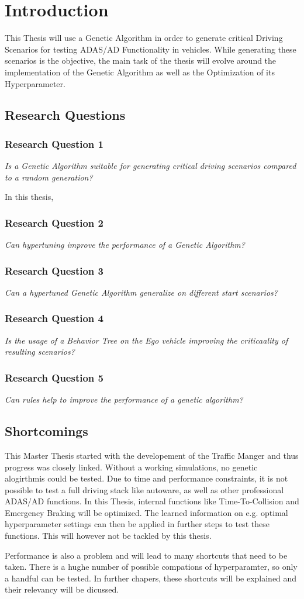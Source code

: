 \chapter{Introduction}
This Thesis will use a Genetic Algorithm in order to generate critical Driving Scenarios for testing ADAS/AD Functionality in vehicles.
While generating these scenarios is the objective, the main task of the thesis will evolve around the implementation of the Genetic Algorithm as well as the Optimization of its Hyperparameter.


\section{Research Questions}
\subsection{Research Question 1}
\textit{Is a Genetic Algorithm suitable for generating critical driving scenarios compared to a random generation?}

In this thesis, 

\subsection{Research Question 2}
\textit{Can hypertuning improve the performance of a Genetic Algorithm?}

\subsection{Research Question 3}
\textit{Can a hypertuned Genetic Algorithm generalize on different start scenarios?}

\subsection{Research Question 4}
\textit{Is the usage of a Behavior Tree on the Ego vehicle improving the criticaality of resulting scenarios?}

\subsection{Research Question 5}
\textit{Can rules help to improve the performance of a genetic algorithm?}


\section{Shortcomings}
This Master Thesis started with the developement of the Traffic Manger and thus progress was closely linked. Without a working simulations, no genetic alogirthmis could be tested. Due to time and performance constraints, it is not possible to test a full driving stack like autoware, as well as other professional ADAS/AD functions.
In this Thesis, internal functions like Time-To-Collision and Emergency Braking will be optimized. The learned  information on e.g. optimal hyperparameter settings can then be applied in further steps to test these functions. This will however not be tackled by this thesis.

Performance is also a problem and will lead to many shortcuts that need to be taken. There is a hughe number of possible compations of hyperparamter, so only a handful can be tested. In further chapers, these shortcuts will be explained and their relevancy will be dicussed.